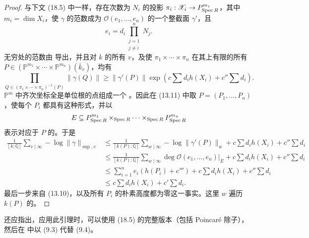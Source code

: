 \begin{proof}
与下文 (18.5) 中一样，存在次数为 $N_i$ 的投影
$\pi_i:\mathscr X_i\to P^{m_i}_{\operatorname{Spec} R}$，其中 $m_i=\dim X_i$，使 $\gamma$ 的范数成为 $\mathcal O(e_1,\ldots,e_n)$ 的一个整截面 $\gamma'$，且
\begin{equation*}\tag{13.10}
e_i=d_i\prod_{\substack{j=1\\j\ne i}}^nN_j.
\end{equation*}
无穷处的范数由 导出，并且对 $k$ 的所有 $v$，及使 $\pi_1\times\cdots\times\pi_n$ 在其上有限的所有 $P\in(\mathbb P^{m_1}\times\cdots\times\mathbb P^{m_n})(\bar k_v)$，均有
\begin{equation*}\tag{13.11}
\prod_{Q\in(\pi_1\times\cdots\times\pi_n)^{-1}(P)}\|\gamma(Q)\|
\ge\|\gamma'(P)\|\exp\!\left(c\sum d_i h(X_i)+c''\sum d_i\right).
\end{equation*}
$\mathbb P^m$ 中齐次坐标全是单位根的点组成一个 。因此在 (13.11) 中取 $P=(P_1,\ldots,P_n)$，使每个 $P_i$ 都具有这种形式，并以
\[
E\subseteq P^{m_1}_{\operatorname{Spec} R}\times_{\operatorname{Spec} R}\cdots\times_{\operatorname{Spec} R}P^{m_n}_{\operatorname{Spec} R}
\]
表示对应于 $P$ 的。于是
\begingroup\small
\begin{align*}
\frac1{[k:\mathbb Q]}\sum_{v\mid\infty}-\log\|\gamma\|_{\sup,v}
&\le\frac1{[k(P):\mathbb Q]}\sum_{w\mid\infty}-\log\|\gamma'(P)\|_w
+c\sum d_i h(X_i)+c''\sum d_i\\
&\le\frac1{[k(P):\mathbb Q]}\sum_{w\mid\infty}\deg\mathcal O(e_1,\ldots,e_n)|_E
+c\sum d_i h(X_i)+c''\sum d_i\\
&\le\sum_{i=1}^ne_i(h(P_i)+c''')+c\sum d_i h(X_i)+c''\sum d_i\\
&\le c\sum d_i h(X_i)+c'\sum d_i.
\end{align*}
\endgroup
最后一步来自 (13.10)，以及所有 $P_i$ 的朴素高度都为零这一事实。这里 $w$ 遍历 $k(P)$ 的。
\end{proof}
还应指出，应用此引理时，可以使用 (18.5) 的完整版本（包括 Poincaré 除子），然后在 中以 (9.3) 代替 (9.4)。

